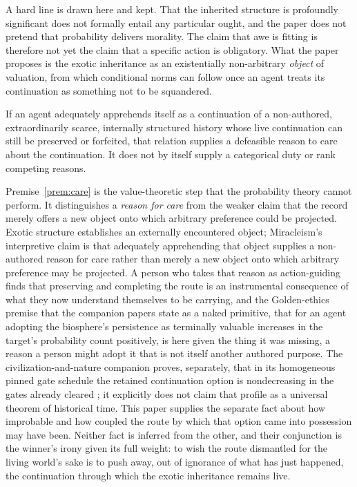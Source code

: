 A hard line is drawn here and kept. That the inherited structure is
profoundly significant does not formally entail any particular ought,
and the paper does not pretend that probability delivers morality. The
claim that awe is fitting is therefore not yet the claim that a specific
action is obligatory. What the paper proposes is the exotic inheritance
as an existentially non-arbitrary \emph{object} of valuation, from which
conditional norms can follow once an agent treats its continuation as
something not to be squandered.

\begin{premise}\label{prem:care}
If an agent adequately apprehends itself as a continuation of a
non-authored, extraordinarily scarce, internally structured history
whose live continuation can still be preserved or forfeited, that
relation supplies a defeasible reason to care about the continuation.
It does not by itself supply a categorical duty or rank competing
reasons.
\end{premise}

\noindent Premise~\ref{prem:care} is the value-theoretic step that the
probability theory cannot perform. It distinguishes a \emph{reason for
care} from the weaker claim that the record merely offers a new object
onto which arbitrary preference could be projected. Exotic structure establishes an
externally encountered object; Miracleism's interpretive claim is that
adequately apprehending that object supplies a non-authored reason for
care rather than merely a new object onto which arbitrary preference may
be projected. A person who takes that reason as action-guiding finds that
preserving and completing the route is an instrumental consequence of
what they now understand themselves to be carrying, and the Golden-ethics premise that the companion papers
state as a naked primitive, that for an agent adopting the biosphere's
persistence as terminally valuable increases in the target's
probability count positively, is here given the thing it was missing,
a reason a person might adopt it that is not itself another authored
purpose. The civilization-and-nature companion proves, separately, that
in its homogeneous pinned gate schedule the retained continuation option
is nondecreasing in the gates already cleared \cite{GoldenCivNature}; it explicitly
does not claim that profile as a universal theorem of historical time.
This paper supplies the separate fact about how improbable and how coupled
the route by which that option came into possession may have been. Neither
fact is inferred from the other, and their conjunction is the winner's
irony given its full weight: to wish the route dismantled for the living
world's sake is to push away, out of ignorance of what has just happened,
the continuation through which the exotic inheritance remains live.


